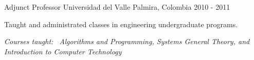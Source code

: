 \begin{cventries}

\cventry
{Adjunct Professor} %
{Universidad del Valle} %
{Palmira, Colombia} %
{2010 - 2011} %
{ %
\begin{cvitems}
\item {Taught and administrated classes in engineering undergraduate programs.}
\end{cvitems}
\vspace{\acvDescAfterDutiesSkip}
\textit{Courses taught:~ Algorithms and Programming, Systems General Theory, and Introduction to Computer Technology}
}

\end{cventries}